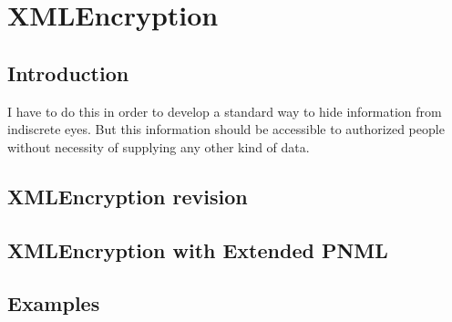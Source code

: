 
\chapter{XMLEncryption} %

\label{ChapterX} %


\section{Introduction}

I have to do this  in order to develop a standard way to hide information
from indiscrete eyes. But this information should be accessible to authorized
people without necessity of supplying any other kind of data.
\section{XMLEncryption revision}

\section{XMLEncryption with Extended PNML}

\section{Examples}


